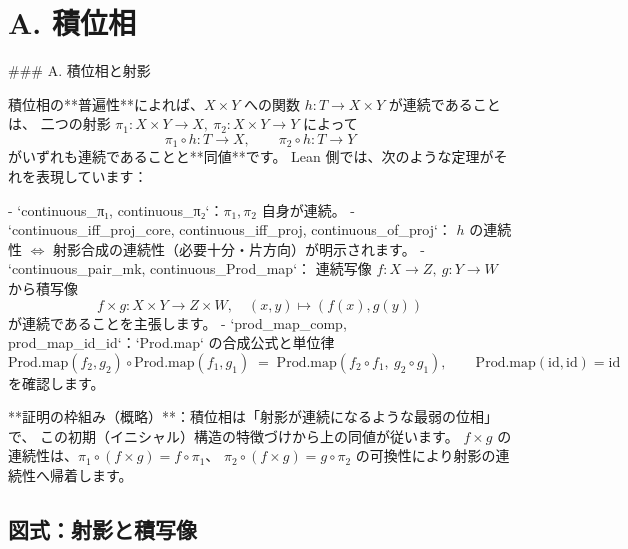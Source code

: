 \documentclass[11pt]{article}
\theoremstyle{definition}
\begin{document}
\section*{A. 積位相}
### A. 積位相と射影

積位相の**普遍性**によれば、$X\times Y$ への関数 $h:T\to X\times Y$ が連続であることは、
二つの射影 $\pi_1:X\times Y\to X,\ \pi_2:X\times Y\to Y$ によって
$$
\pi_1\circ h : T\to X,\qquad \pi_2\circ h : T\to Y
$$
がいずれも連続であることと**同値**です。
Lean 側では、次のような定理がそれを表現しています：

- `continuous_π₁, continuous_π₂`：$\pi_1,\pi_2$ 自身が連続。
- `continuous_iff_proj_core, continuous_iff_proj, continuous_of_proj`：
  $h$ の連続性 $\Leftrightarrow$ 射影合成の連続性（必要十分・片方向）が明示されます。
- `continuous_pair_mk, continuous_Prod_map`：
  連続写像 $f:X\to Z,\ g:Y\to W$ から積写像
  $$
  f\times g : X\times Y \longrightarrow Z\times W,\quad (x,y)\mapsto (f(x),g(y))
  $$
  が連続であることを主張します。
- `prod_map_comp, prod_map_id_id`：`Prod.map` の合成公式と単位律
  $$
  \mathrm{Prod.map}(f_2,g_2)\circ \mathrm{Prod.map}(f_1,g_1)
   \;=\; \mathrm{Prod.map}(f_2\circ f_1,\ g_2\circ g_1),
  \qquad
  \mathrm{Prod.map}(\mathrm{id},\mathrm{id})=\mathrm{id}
  $$
  を確認します。

**証明の枠組み（概略）**：積位相は「射影が連続になるような最弱の位相」で、
この初期（イニシャル）構造の特徴づけから上の同値が従います。
$f\times g$ の連続性は、$\pi_1\circ(f\times g)=f\circ\pi_1$、
$\pi_2\circ(f\times g)=g\circ\pi_2$ の可換性により射影の連続性へ帰着します。

\subsection*{図式：射影と積写像}



\medskip


\qquad
{}
\end{document}
